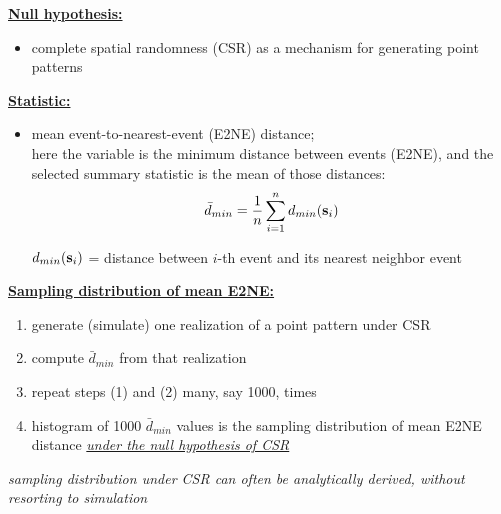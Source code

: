 \documentclass[portrait]{seminar}
\begin{document}
%
%
\begin{slide*}
\begin{center}
 \vspace*{-0.5cm} 
\end{center}
 \vspace{0.3cm}

\underline{\textbf{Null hypothesis:}}
\begin{itemize}
\item complete spatial randomness (CSR) as a mechanism for
generating point patterns
\end{itemize}

\vspace{0.3cm} \underline{\textbf{Statistic:}}
\begin{itemize}
\item mean event-to-nearest-event (E2NE) distance;
\\ here the variable is the minimum distance between events (E2NE),
and the selected summary statistic is the mean of those distances:
\[
\bar{d}_{min} = \frac{1}{n} \sum_{i=1}^n d_{min}({\bf s}_i)
\]
\begin{center}
{\small $d_{min}({\bf s}_i)$ = distance between $i$-th event and its
nearest neighbor event}
\end{center}
\end{itemize}

\vspace{0.3cm} \underline{\textbf{Sampling distribution of mean
E2NE:}}
\begin{enumerate}
\item generate (simulate) one realization of a point pattern under CSR
\item compute $\bar{d}_{min}$ from that realization
\item repeat steps (1) and (2) many, say 1000, times
\item histogram of 1000 $\bar{d}_{min}$ values is the sampling
distribution of mean E2NE distance \emph{\underline{under the null
hypothesis of CSR}}
\end{enumerate}

\vspace{0.2cm}
\begin{center}
\emph{sampling distribution under CSR can often be analytically
derived, without resorting to simulation}
\end{center}

\end{slide*}
\end{document}
